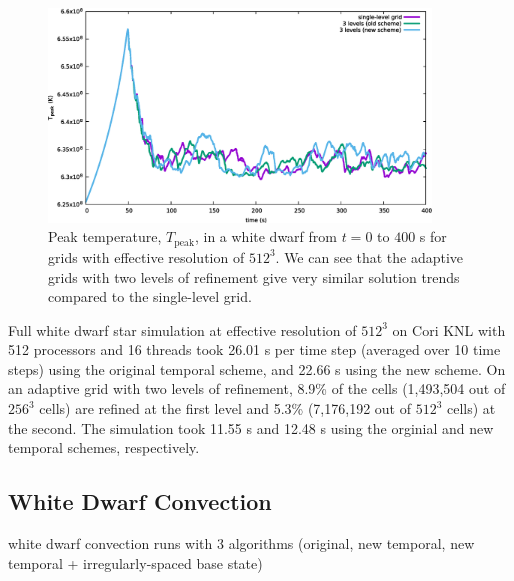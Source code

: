\begin{figure}[htb]
\begin{center}
\includegraphics[width=4.0in]{./figs/wdconvect_amr_Tmax} 
\caption{\label{fig:wdconvect_amr_Tmax} Peak temperature, $T_{\text{peak}}$, in a white dwarf from $t=0$ to $400$ s 
         for grids with effective resolution of $512^3$. We can see that the adaptive grids with two levels of 
         refinement give very similar solution trends compared to the single-level grid.}
\end{center}
\end{figure}

Full white dwarf star simulation at effective resolution of $512^3$ on Cori KNL with 512 processors and 16 threads took 26.01 s per time step (averaged over 10 time steps) using the original temporal scheme, and 22.66 s using the new scheme. On an adaptive grid with two levels of refinement, 8.9\% of the cells (1,493,504 out of $256^3$ cells) are refined at the first level and 5.3\% (7,176,192 out of $512^3$ cells) at the second. The simulation took 11.55 s and 12.48 s using the orginial and new temporal schemes, respectively. 



\subsection{White Dwarf Convection}

white dwarf convection runs with 3 algorithms (original, new temporal, new temporal + irregularly-spaced base state)

